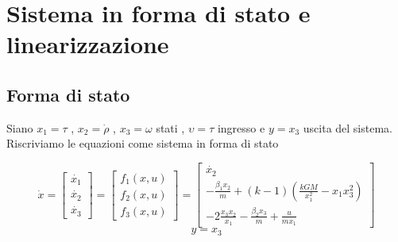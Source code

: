 \documentclass{article}
\begin{document}
\section{Sistema in forma di stato e linearizzazione}
\subsection{Forma di stato}
Siano $x_1=\tau$ , $x_2=\Dot{\rho}$ , $x_3=\omega$ stati , $\upsilon=\tau$ ingresso e $y=x_3$ uscita del sistema.\\
Riscriviamo le equazioni come sistema in forma di stato\\
\begin{large}
\[
\Dot{x}=
\begin{bmatrix} \Dot{x_1} \\\Dot{x_2} \\ \Dot{x_3}\end{bmatrix} =
\begin{bmatrix} f_1(x,u) \\ f_2(x,u) \\ f_3(x,u)\end{bmatrix} =
\begin{bmatrix} \dot{x_2} \\
-\frac{\beta_1 x_2}{m} + (k-1)(\frac{kG M}{x_1^2} - x_1 x_3^2) \\ 
-2\frac{x_3 x_2}{x_1} - \frac{\beta_2 x_3}{m} + \frac{u}{m x_1}  \end{bmatrix}
\]
\[
y=x_3
\]
\end{large}
\end{document}
